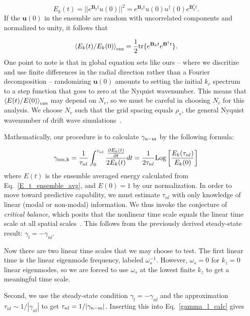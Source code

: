 \documentclass[letter,scriptaddress,twocolumn, prl,showkeys]{revtex4}
\def\beq{\begin{equation}}
\def\eeq{\end{equation}}
\newcommand{\pdiff}[2]{\frac{\partial#1}{\partial#2}}
\begin{document}
\beq
\label{E_t_from_u0}
E_k(t) = ||e^{\mathbf{B}_k t} u(0)||^2 = e^{\mathbf{B}_k t} u(0) u^{\dagger}(0) e^{\mathbf{B}_k^{\dagger}t}.
\eeq
If the $\mathbf{u}(0)$ in the ensemble are random with uncorrelated components and normalized to unity, it follows that~\cite{camargo1998}

\beq
\label{E_t_ensemble_avg}
\left< E_k(t)/E_k(0) \right>_{{\rm{ens}}} = \frac{1}{2} {\rm{tr}} \{ e^{\mathbf{B}_k t} e^{\mathbf{B}^{\dagger}t} \}.
\eeq
One point to note is that in global equation sets like ours -- where we discritize and use finite differences in the radial direction rather than a Fourier decomposition -- randomizing $\mathbf{u}(0)$
amounts to setting the initial $k_r$ spectrum to a step function that goes to zero at the Nyquist wavenumber. This means that $\left< E(t)/E(0) \right>_{{\rm{ens}}}$ may depend on $N_r$, so we must be careful in
choosing $N_r$ for this analysis. We choose $N_r$ such that the grid spacing equals $\rho_s$, the general Nyquist wavenumber of drift wave simulations~\cite{scott1992}.

Mathematically, our procedure is to calculate $\gamma_{\rm{n-m}}$ by the following formula:

\beq
\label{gamma_l_calc}
\gamma_{\rm{nm},k} = \frac{1}{\tau_{nl}} \int_0^{\tau_{nl}} \frac{\pdiff{E_k(t)}{t}}{2 E_k(t)} dt = \frac{1}{2 \tau_{nl}} {\rm{Log}} \left[ \frac{E_k(\tau_{nl})}{E_k(0)}\right]
\eeq
where $E(t)$ is the ensemble averaged energy calculated from Eq.~\ref{E_t_ensemble_avg}, and $E(0) = 1$ by our normalization.
In order to move toward predictive capability, we must estimate $\tau_{nl}$ with only knowledge of linear (modal or non-modal) information. 
We thus invoke the conjecture of \emph{critical balance}, which posits that the nonlinear time scale equals the linear time scale at all spatial scales~\cite{schekochihin2012}. This follows from 
the previously derived steady-state result: $\gamma_l = - \gamma_{nl}$. 

Now there are two linear time scales that we may choose to test. The first linear time is the linear eigenmode frequency, labeled
$\omega_s^{-1}$. However, $\omega_s = 0$ for $k_z=0$ linear eigenmodes, so we are forced to use $\omega_s$ at the lowest finite $k_z$ to get a meaningful time scale.

Second, we use the steady-state condition $\gamma_l = - \gamma_{nl}$ and the approximation $\tau_{nl} \sim 1/|\gamma_{nl}|$ to get $\tau_{nl} = 1/|\gamma_{\rm{n-m}}|$. 
Inserting this into Eq.~\ref{gamma_l_calc} gives
\end{document}
